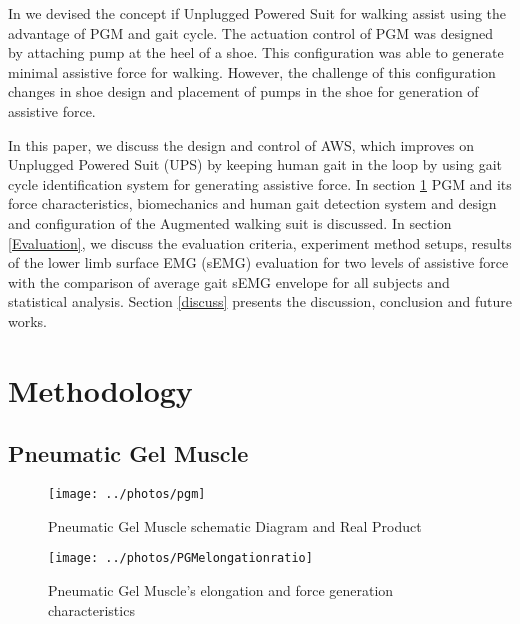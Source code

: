 \documentclass[letterpaper, 10 pt, conference]{ieeeconf}  %
\begin{document}
In \cite{9} we devised the concept if Unplugged Powered Suit for walking assist using the advantage of PGM and gait cycle. The actuation control of PGM was designed by attaching pump at the heel of a shoe. This configuration was able to generate minimal assistive force for walking. However, the challenge of this configuration changes in shoe design and placement of pumps in the shoe for generation of assistive force. 

In this paper, we discuss the design and control of AWS, which improves on Unplugged Powered Suit (UPS) by keeping human gait in the loop by using gait cycle identification system for generating assistive force. In section \ref{methodology} PGM and its force characteristics, biomechanics and human gait detection system and design and configuration of the Augmented walking suit is discussed. In section \ref{Evaluation}, we discuss the evaluation criteria, experiment method setups, results of the lower limb surface EMG (sEMG) evaluation for two levels of assistive force with the comparison of average gait sEMG envelope for all subjects and statistical analysis. Section \ref{discuss} presents the discussion, conclusion and future works.


\section{Methodology} \label{methodology}

\subsection{Pneumatic Gel Muscle} \label{pgm}
\begin{figure}
	\centering
	\texttt{[image: ../photos/pgm]}
	\caption{Pneumatic Gel Muscle schematic Diagram and Real Product}
	\label{fig:pgm}
\end{figure}
\begin{figure}
	\centering
	\texttt{[image: ../photos/PGMelongationratio]}
	\caption{Pneumatic Gel Muscle's elongation and force generation characteristics \cite{7}}
	\label{fig:pgmelongationratio}
\end{figure}
\end{document}
